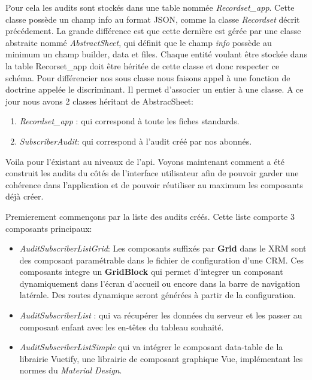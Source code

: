 Pour cela les audits sont stockés dans une table nommée \textit{Recordset\_app}. Cette classe possède un champ info au format JSON, comme la classe \textit{Recordset}  décrit précédement. La grande différence est que cette dernière est gérée par une classe abstraite nommé \textit{AbstractSheet}, qui définit que le champ \textit{info} possède au minimum un champ builder, data et files. Chaque entité voulant être stockée dans la table Recorset\_app doit être héritée de cette classe et donc respecter ce schéma. Pour différencier nos sous classe nous faisons appel à une fonction de doctrine appelée le discriminant. Il permet d'associer un entier à une classe. A ce jour nous avons 2 classes héritant de AbstracSheet: 
\begin{enumerate}
    \item \textit{Recordset\_app} : qui correspond à toute les fiches standards. 
    \item \textit{SubscriberAudit}: qui correspond à l'audit créé par nos abonnés. 
\end{enumerate}

Voila pour l'éxistant au niveaux de l'api. Voyons maintenant comment a été construit les audits du côtés de l'interface utilisateur afin de pouvoir garder une cohérence dans l'application et de pouvoir réutiliser au maximum les composants déjà créer. 

Premierement commençons par la liste des audits créés. Cette liste comporte 3 composants principaux: 
\begin{itemize}
    \item  \textit{AuditSubscriberListGrid}: Les composants suffixés par \textbf{Grid} dans le XRM sont des composant paramétrable dans le fichier de configuration d'une CRM. Ces composants integre un  \textbf{GridBlock} qui permet d'integrer un composant dynamiquement dans l'écran d'accueil ou encore dans la barre de navigation latérale. Des routes dynamique seront générées à partir de la configuration.
    \item \textit{AuditSubscriberList} : qui va récupérer les données du serveur et les passer au composant enfant avec les en-têtes du tableau souhaité.  
    \item \textit{AuditSubscriberListSimple} qui va intégrer le composant data-table de la librairie Vuetify\cite{vuetify}, une librairie de composant graphique Vue, implémentant les normes du \textit{Material Design}\cite{material}.
\end{itemize}

